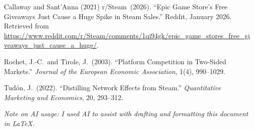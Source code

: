 \documentclass[11pt]{article}
\begin{document}
\begin{thebibliography}{Callaway and Sant'Anna (2021)}
r/Steam\ (2026).
``Epic Game Store's Free Giveaways Just Cause a Huge Spike in Steam Sales.''
Reddit, January 2026.
Retrieved from \url{https://www.reddit.com/r/Steam/comments/1qi94gk/epic_game_stores_free_giveaways_just_cause_a_huge/}.

Rochet, J.-C.\ and Tirole, J.\ (2003).
``Platform Competition in Two-Sided Markets.''
\textit{Journal of the European Economic Association}, 1(4), 990--1029.

Tud\'on, J.\ (2022).
``Distilling Network Effects from Steam.''
\textit{Quantitative Marketing and Economics}, 20, 293--312.

\end{thebibliography}

\vspace{1em}
\noindent\textit{Note on AI usage: I used AI to assist with drafting and formatting this
document in \LaTeX.}
\end{document}
